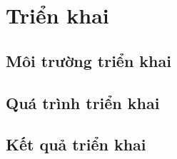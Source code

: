 \chapter{Triển khai}
    \section{Môi trường triển khai}
    \section{Quá trình triển khai}
    \section{Kết quả triển khai}